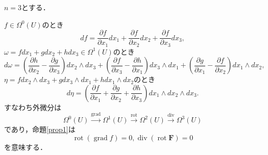 \documentclass[uplatex]{jsarticle}
\begin{document}
\begin{example}
$n=3$とする．

$f\in\Omega^0(U)$のとき
\[ df=\frac{\partial f}{\partial x_1}dx_1+\frac{\partial f}{\partial x_2}dx_2+\frac{\partial f}{\partial x_3}dx_3, \]
$\omega = fdx_1+gdx_2+hdx_3\in\Omega^1(U)$のとき
\[ d\omega = \left(\frac{\partial h}{\partial x_2}-\frac{\partial g}{\partial x_3}\right)dx_2\wedge dx_3+\left(\frac{\partial f}{\partial x_3}-\frac{\partial h}{\partial x_1}\right)dx_3\wedge dx_1+\left(\frac{\partial g}{\partial x_1}-\frac{\partial f}{\partial x_2}\right)dx_1\wedge dx_2, \]
$\eta = fdx_2\wedge dx_3+gdx_3\wedge dx_1+hdx_1\wedge dx_2$のとき
\[ d\eta = \left(\frac{\partial f}{\partial x_1}+\frac{\partial g}{\partial x_2}+\frac{\partial h}{\partial x_3}\right)dx_1\wedge dx_2\wedge dx_3. \]
すなわち外微分は
\[ \Omega^0(U)\stackrel{\operatorname{grad}}{\to}\Omega^1(U)\stackrel{\operatorname{rot}}{\to}\Omega^2(U)\stackrel{\operatorname{div}}{\to}\Omega^3(U) \]
であり，命題\ref{prop1}は
\[ \operatorname{rot}(\operatorname{grad}f)=0, \operatorname{div}(\operatorname{rot}\mathbf{F})=0 \]
を意味する．
\end{example}
\end{document}
